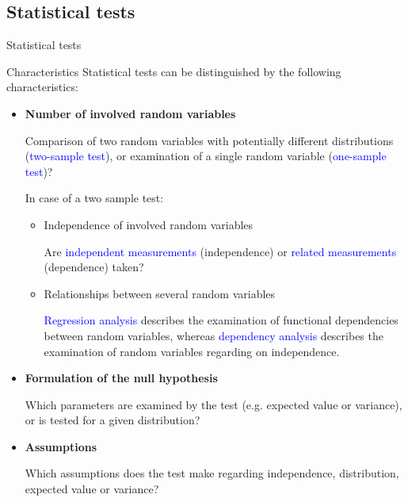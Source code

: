 \documentclass{beamer}
\def\b{\textcolor{blue}}
\begin{document}
\subsection{Statistical tests}
\begin{frame}{Statistical tests}
    \begin{block}{Characteristics}
        Statistical tests can be distinguished by the following characteristics:
        \begin{itemize}
            \item \textbf{Number of involved random variables}\pause\par
                Comparison of two random variables with potentially different distributions (\b{two-sample test}), or examination of a single random variable (\b{one-sample test})?\pause\par
                In case of a two sample test:
                \begin{itemize}
                    \item Independence of involved random variables\par
                        Are \b{independent measurements} (independence) or \b{related measurements} (dependence) taken?\pause
                    \item Relationships between several random variables\par
                        \b{Regression analysis} describes the examination of functional dependencies between random variables, whereas \b{dependency analysis} describes the examination of random variables regarding on independence.
                \end{itemize}
        \end{itemize}
    \end{block}
\end{frame}

\begin{frame}
    \begin{itemize}
        \item \textbf{Formulation of the null hypothesis}\pause\par
            Which parameters are examined by the test (e.g. expected value or variance), or is tested for a given distribution?\pause
        \item \textbf{Assumptions}\pause\par
            Which assumptions does the test make regarding independence, distribution, expected value or variance?
    \end{itemize}
\end{frame}
\end{document}

